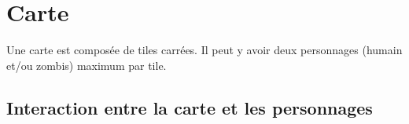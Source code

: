 \section{Carte}
Une carte est composée de tiles carrées. Il peut y avoir deux personnages (humain et/ou zombis) maximum par tile.
\subsection{Interaction entre la carte et les personnages}

